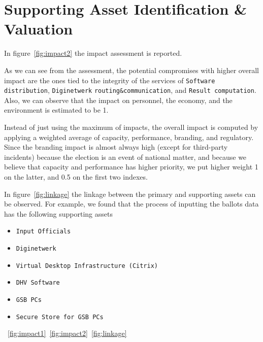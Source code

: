 \section*{Supporting Asset Identification \& Valuation}

In figure~\ref{fig:impact2} the impact assessment is reported.

As we can see from the assessment, the potential compromises with higher overall impact are the ones tied to the integrity of the services of \texttt{Software distribution}, \texttt{Diginetwerk} \texttt{routing\&communication}, and \texttt{Result computation}. Also, we can observe that the impact on personnel, the economy, and the environment is estimated to be 1. 

Instead of just using the maximum of impacts, the overall impact is computed by applying a weighted average of capacity, performance, branding, and regulatory. Since the branding impact is almost always high (except for third-party incidents) because the election is an event of national matter, and because we believe that capacity and performance has higher priority, we put higher weight 1 on the latter, and 0.5 on the first two indexes.

In figure~\ref{fig:linkage} the linkage between the primary and supporting assets can be observed. For example, we found that the process of inputting the ballots data has the following supporting assets

\begin{itemize}
    \item \texttt{Input Officials}
    \item \texttt{Diginetwerk}
    \item \texttt{Virtual Desktop Infrastructure (Citrix)}
    \item \texttt{DHV Software}
    \item \texttt{GSB PCs}
    \item \texttt{Secure Store for GSB PCs}
\end{itemize}

~\ref{fig:impact1}~\ref{fig:impact2}~\ref{fig:linkage}

\newpage
